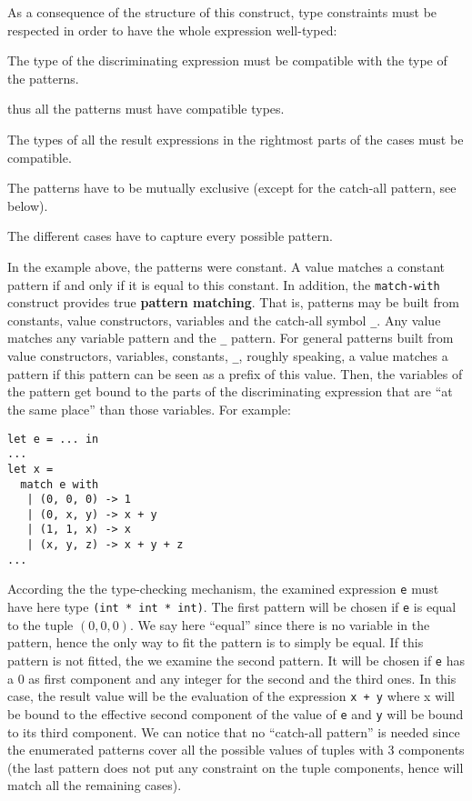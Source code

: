 \smallskip
As a consequence of the structure of this construct, type constraints
must be respected in order to have the whole expression well-typed:
\begin{compact-itemize}
  \item The type of the discriminating expression must be compatible with the
    type of the patterns.
  \item thus all the patterns must have compatible
    types.
  \item The types of all the result expressions in the rightmost parts
    of the cases must be compatible.
  \item The patterns have to be mutually exclusive (except for the catch-all
        pattern, see below).
  \item The different cases have to capture every possible pattern.
\end{compact-itemize}

\medskip In the example above, the patterns were constant. A value
matches a constant pattern if and only if it is equal to this
constant.  In addition, the
{\tt match-with} construct provides true {\bf pattern matching}. That
is, patterns may be built from constants, value constructors,
variables and the catch-all symbol {\tt \_}. Any value matches any
variable pattern and the {\tt \_} pattern. For general patterns built
from value constructors, variables, constants, {\tt \_}, roughly
speaking, a value matches a pattern if this pattern can be seen as a
prefix of this value. Then, the variables of the pattern get bound to
the parts of the discriminating expression that are ``at the same
place'' than those variables. For example:

{\scriptsize
\begin{lstlisting}
let e = ... in
...
let x =
  match e with
   | (0, 0, 0) -> 1
   | (0, x, y) -> x + y
   | (1, 1, x) -> x
   | (x, y, z) -> x + y + z
...
\end{lstlisting}}

According the the type-checking mechanism, the examined expression
{\tt e} must have here type {\tt (int * int * int)}. The first pattern
will be chosen if {\tt e} is  equal to the tuple $(0, 0, 0)$. We
say here ``equal'' since there is no variable in the pattern, hence
the only way to fit the pattern is to simply  be equal. If this pattern
is not fitted, the we examine the second pattern. It will be chosen if
{\tt e} has a $0$ as first component and any integer for the second
and the third ones. In this case, the result value will be the
evaluation of the expression {\tt x + y} where x will be bound to the
effective second component of the value of {\tt e} and {\tt y} will be
bound to its third component. We can notice that no ``catch-all pattern''
is needed since the enumerated patterns cover all the possible values
of tuples with 3 components (the last pattern does not put
any constraint on the tuple components, hence will match all the
remaining cases).

